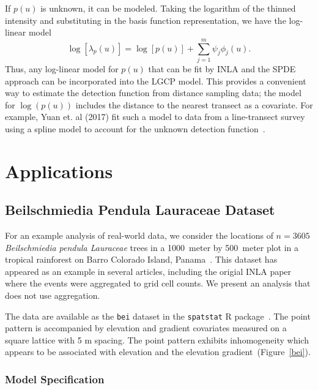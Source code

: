 \documentclass[]{interact}
\begin{document}
If \(p(u)\) is unknown, it can be modeled. Taking the logarithm of
the thinned intensity and substituting in the basis function representation,
we have the log-linear model
\begin{displaymath}
\log\left[\lambda_{p}(u)\right]
= \log\left[p(u)\right] + \sum_{j = 1}^{m} \psi_{j} \phi_{j}(u).
\end{displaymath}
Thus, any log-linear model for \(p(u)\) that can be fit by INLA and the SPDE
approach can be incorporated into the LGCP model. This provides a convenient
way to estimate the detection function from distance sampling data; the model
for \(\log(p(u))\) includes the distance to the nearest transect as a
covariate. For example, Yuan et. al (2017) fit such a model to data from a
line-transect survey using a spline model to account for the unknown detection
function~\cite{yuanetal}.


\section{Applications}
\label{application}


\subsection{Beilschmiedia Pendula Lauraceae Dataset}
\label{beianalysis}

For an example analysis of real-world data, we consider the locations of
\(n = 3605\) \emph{Beilschmiedia pendula Lauraceae} trees in a 1000~meter by
500~meter plot in a tropical rainforest on Barro Colorado Island,
Panama~\cite{moellerwaagepetersen}. This dataset has appeared as an example
in several articles, including the origial INLA paper where the events were
aggregated to grid cell counts. We present an analysis that does not use
aggregation.

The data are available as the \texttt{bei} dataset in the \texttt{spatstat} R
package~\cite{spatstat}. The point pattern is accompanied by elevation and
gradient covariates measured on a square lattice with 5 m spacing. The point
pattern exhibits inhomogeneity which appears to be associated with elevation
and the elevation gradient~(Figure~\ref{bei}).


\subsubsection{Model Specification}
\label{beimodel}
\end{document}
